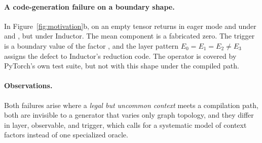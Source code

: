 \paragraph{A code-generation failure on a boundary shape.} In Figure~\ref{fig:motivation}b,
 on an empty tensor returns  in eager mode and under \EO and \ET, but
 under Inductor. The mean component is a fabricated zero. The trigger is a boundary value of the
factor , and the layer pattern $E_0{=}E_1{=}E_2{\neq}E_3$ assigns the defect to Inductor's
reduction code. The operator is covered by PyTorch's own test suite, but not with this shape under the compiled
path.

\paragraph{Observations.} Both failures arise where a \emph{legal but uncommon context} meets a compilation
path, both are invisible to a generator that varies only graph topology, and they differ in layer, observable,
and trigger, which calls for a systematic model of context factors instead of one specialized oracle.
